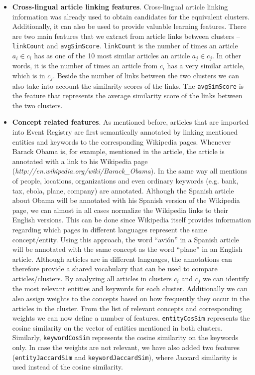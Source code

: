 \documentclass[twoside,11pt]{article}
\begin{document}
\begin{itemize}
\item {\bf Cross-lingual article linking features}. Cross-lingual article linking information was already used to obtain candidates for the equivalent clusters. Additionally, it can also be used to provide valuable learning features. There are two main features that we extract from article links between clusters -- \texttt{linkCount} and \texttt{avgSimScore}. \texttt{linkCount} is the number of times an article $a_i \in c_i$ has as one of the 10 most similar articles an article $a_j \in c_j$. In other words, it is the number of times an article from $c_i$ has a very similar article, which is in $c_j$. Beside the number of links between the two clusters we can also take into account the similarity scores of the links. The \texttt{avgSimScore} is the feature that represents the average similarity score of the links between the two clusters.

\item {\bf Concept related features}. As mentioned before, articles that are imported into Event Registry are first semantically annotated by linking mentioned entities and keywords to the corresponding Wikipedia pages. Whenever Barack Obama is, for example, mentioned in the article, the article is annotated with a link to his Wikipedia page (\emph{http://en.wikipedia.org/wiki/Barack\_Obama}). In the same way all mentions of people, locations, organizations and even ordinary keywords (e.g. bank, tax, ebola, plane, company) are annotated. Although the Spanish article about Obama will be annotated with his Spanish version of the Wikipedia page, we can almost in all cases normalize the Wikipedia links to their English versions. This can be done since Wikipedia itself provides information regarding which pages in different languages represent the same concept/entity. Using this approach, the word ``avi\'on'' in a Spanish article will be annotated with the same concept as the word ``plane'' in an English article. Although articles are in different languages, the annotations can therefore provide a shared vocabulary that can be used to compare articles/clusters. By analyzing all articles in clusters $c_i$ and $c_j$ we can identify the most relevant entities and keywords for each cluster. Additionally we can also assign weights to the concepts based on how frequently they occur in the articles in the cluster. From the list of relevant concepts and corresponding weights we can now define a number of features. \texttt{entityCosSim} represents the cosine similarity on the vector of entities mentioned in both clusters. Similarly, \texttt{keywordCosSim} represents the cosine similarity on the keywords only. In case the weights are not relevant, we have also added two features (\texttt{entityJaccardSim} and \texttt{keywordJaccardSim}), where Jaccard similarity is used instead of the cosine similarity.


\end{itemize}
\end{document}
